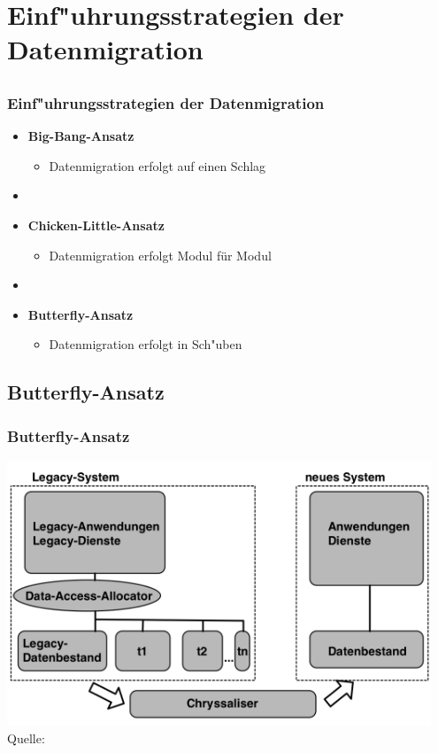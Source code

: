 \documentclass{beamer}
\begin{document}
	\section{Einf"uhrungsstrategien der Datenmigration}
	
	\subsection{}
	
	\begin{frame}
		\frametitle{Einf"uhrungsstrategien der Datenmigration}

		\begin{itemize}
			\item \textbf{Big-Bang-Ansatz}
				\begin{itemize}
					\item Datenmigration erfolgt auf einen Schlag
				\end{itemize}
			\item[]
			\item \textbf{Chicken-Little-Ansatz}
				\begin{itemize}
					\item Datenmigration erfolgt Modul für Modul
				\end{itemize}
			\item[]
			\item \textbf{Butterfly-Ansatz}
				\begin{itemize}
					\item Datenmigration erfolgt in Sch"uben
				\end{itemize}			
		\end{itemize}		
	\end{frame}
	
	\subsection{Butterfly-Ansatz}
	
	\begin{frame}
		\frametitle{Butterfly-Ansatz}
		
		\centering
		\includegraphics[width=0.95\textwidth]{../images/Butterfly.png} \\
		\tiny Quelle:  \cite{bisbal-1999}	
	\end{frame}
	
\end{document}
